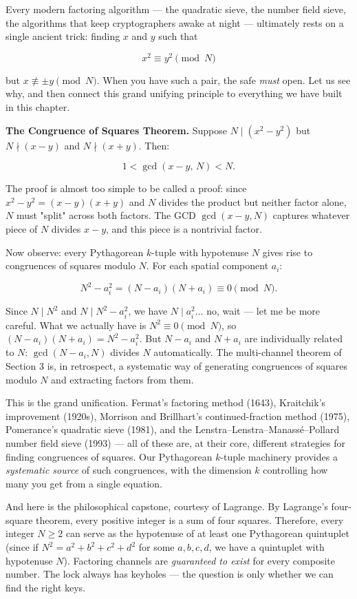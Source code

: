 Every modern factoring algorithm --- the quadratic sieve, the number field sieve, the algorithms that keep cryptographers awake at night --- ultimately rests on a single ancient trick: finding $x$ and $y$ such that

\[
x^2 \equiv y^2 \pmod{N}
\]

but $x \not\equiv \pm y \pmod{N}$. When you have such a pair, the safe \textit{must} open. Let us see why, and then connect this grand unifying principle to everything we have built in this chapter.

\textbf{The Congruence of Squares Theorem.} Suppose $N \mid (x^2 - y^2)$ but $N \nmid (x - y)$ and $N \nmid (x + y)$. Then:

\[
1 < \gcd(x - y, \, N) < N.
\]

The proof is almost too simple to be called a proof: since $x^2 - y^2 = (x - y)(x + y)$ and $N$ divides the product but neither factor alone, $N$ must "split" across both factors. The GCD $\gcd(x - y, N)$ captures whatever piece of $N$ divides $x - y$, and this piece is a nontrivial factor.

Now observe: every Pythagorean $k$-tuple with hypotenuse $N$ gives rise to congruences of squares modulo $N$. For each spatial component $a_i$:

\[
N^2 - a_i^2 = (N - a_i)(N + a_i) \equiv 0 \pmod{N}.
\]

Since $N \mid N^2$ and $N \mid N^2 - a_i^2$, we have $N \mid a_i^2$... no, wait --- let me be more careful. What we actually have is $N^2 \equiv 0 \pmod{N}$, so $(N - a_i)(N + a_i) = N^2 - a_i^2$. But $N - a_i$ and $N + a_i$ are individually related to $N$: $\gcd(N - a_i, N)$ divides $N$ automatically. The multi-channel theorem of Section 3 is, in retrospect, a systematic way of generating congruences of squares modulo $N$ and extracting factors from them.

This is the grand unification. Fermat's factoring method (1643), Kraitchik's improvement (1920s), Morrison and Brillhart's continued-fraction method (1975), Pomerance's quadratic sieve (1981), and the Lenstra--Lenstra--Manassé--Pollard number field sieve (1993) --- all of these are, at their core, different strategies for finding congruences of squares. Our Pythagorean $k$-tuple machinery provides a \textit{systematic source} of such congruences, with the dimension $k$ controlling how many you get from a single equation.

And here is the philosophical capstone, courtesy of Lagrange. By Lagrange's four-square theorem, every positive integer is a sum of four squares. Therefore, every integer $N \geq 2$ can serve as the hypotenuse of at least one Pythagorean quintuplet (since if $N^2 = a^2 + b^2 + c^2 + d^2$ for some $a, b, c, d$, we have a quintuplet with hypotenuse $N$). Factoring channels are \textit{guaranteed to exist} for every composite number. The lock always has keyholes --- the question is only whether we can find the right keys.


